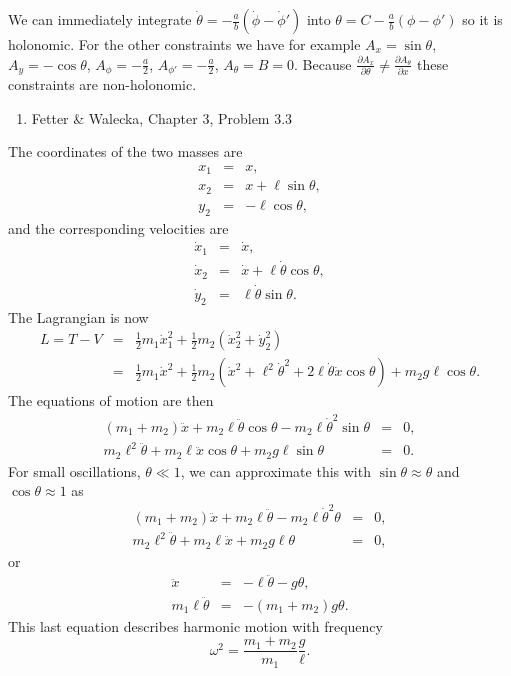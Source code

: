\documentclass[letterpaper,11pt]{article}
\begin{document}
We can immediately integrate $\dot\theta = -\frac{a}{b} (\dot\phi - \dot\phi')$ into $\theta = C - \frac{a}{b} (\phi - \phi')$ so it is holonomic.  For the other constraints we have for example $A_x = \sin\theta$, $A_y = -\cos\theta$, $A_\phi = -\frac{a}{2}$, $A_{\phi'} = -\frac{a}{2}$, $A_\theta = B = 0$.  Because $\frac{\partial A_x}{\partial \theta} \neq \frac{\partial A_\theta}{\partial x}$ these constraints are non-holonomic.

\begin{enumerate}[resume]
 \item Fetter \& Walecka, Chapter 3, Problem 3.3
\end{enumerate}
The coordinates of the two masses are
\begin{eqnarray*}
 x_1 & = & x, \\
 x_2 & = & x + \ell\sin\theta, \\
 y_2 & = & -\ell\cos\theta,
\end{eqnarray*}
and the corresponding velocities are
\begin{eqnarray*}
 \dot{x}_1 & = & \dot{x}, \\
 \dot{x}_2 & = & \dot{x} + \ell\dot\theta\cos\theta, \\
 \dot{y}_2 & = & \ell\dot\theta\sin\theta.
\end{eqnarray*}
The Lagrangian is now
\begin{eqnarray*}
 L = T - V & = & \frac{1}{2} m_1 \dot{x}_1^2 + \frac{1}{2} m_2 (\dot{x}_2^2 + \dot{y}_2^2) \\
 & = & \frac{1}{2} m_1 \dot{x}^2 + \frac{1}{2} m_2 (\dot{x}^2 + \ell^2\dot\theta^2 + 2\ell\dot\theta\dot{x}\cos\theta) + m_2 g \ell\cos\theta.
\end{eqnarray*}
The equations of motion are then
\begin{eqnarray*}
 (m_1 + m_2) \ddot{x} + m_2 \ell\ddot\theta\cos\theta - m_2 \ell\dot\theta^2\sin\theta & = & 0, \\
 m_2 \ell^2 \ddot\theta + m_2 \ell\ddot{x} \cos\theta + m_2 g\ell\sin\theta & = & 0.
\end{eqnarray*}
For small oscillations, $\theta \ll 1$, we can approximate this with $\sin\theta \approx \theta$ and $\cos\theta \approx 1$ as
\begin{eqnarray*}
 (m_1 + m_2) \ddot{x} + m_2 \ell\ddot\theta - m_2 \ell\dot\theta^2\theta & = & 0, \\
 m_2 \ell^2 \ddot\theta + m_2 \ell\ddot{x} + m_2 g\ell\theta & = & 0,
\end{eqnarray*}
or
\begin{eqnarray*}
 \ddot{x} & = & - \ell\ddot\theta - g\theta, \\
 m_1 \ell\ddot\theta & = & - (m_1 + m_2) g \theta.
\end{eqnarray*}
This last equation describes harmonic motion with frequency
\begin{equation*}
 \omega^2 = \frac{m_1 + m_2}{m_1} \frac{g}{\ell}.
\end{equation*}
\end{document}
